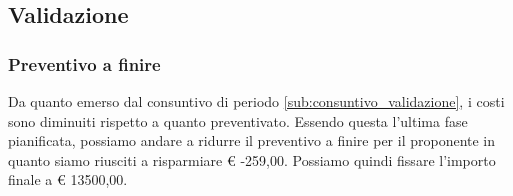 		\subsection{Validazione} %

			\subsubsection{Preventivo a finire} %
						Da quanto emerso dal consuntivo di periodo \ref{sub:consuntivo_validazione}, i costi sono diminuiti rispetto a quanto preventivato. Essendo questa l'ultima fase pianificata, possiamo andare a ridurre il preventivo a finire per il proponente in quanto siamo riusciti a risparmiare  \euro{} -259,00. Possiamo quindi fissare l'importo finale a \euro{} 13500,00.

